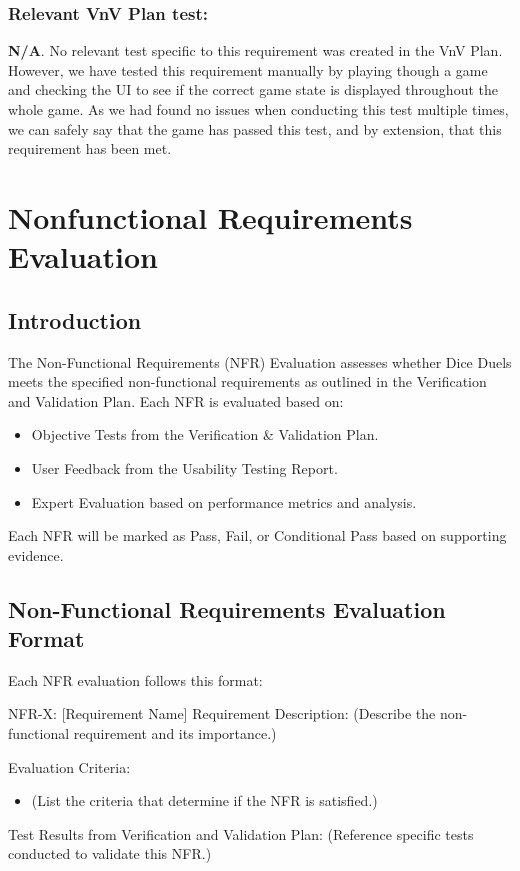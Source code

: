 \documentclass[12pt, titlepage]{article}
\begin{document}
 \subsubsection*{Relevant VnV Plan test: } \textbf{N/A}. No relevant test specific to this requirement was created in the VnV Plan. However, we have tested this requirement manually by  playing though a game and checking the UI to see if the correct game state is displayed throughout the whole game. As we had found no issues when conducting this test multiple times, we can safely say that the game has passed this test, and by extension, that this requirement has been met.


\newpage
\section{Nonfunctional Requirements Evaluation}

\subsection{Introduction}

The Non-Functional Requirements (NFR) Evaluation assesses whether Dice Duels meets the specified non-functional requirements as outlined in the Verification and Validation Plan. Each NFR is evaluated based on:
\begin{itemize}
	\item Objective Tests from the Verification \& Validation Plan.
	\item User Feedback from the Usability Testing Report.
	\item Expert Evaluation based on performance metrics and analysis.
\end{itemize}
Each NFR will be marked as Pass, Fail, or Conditional Pass based on supporting evidence.

\subsection{Non-Functional Requirements Evaluation Format}

Each NFR evaluation follows this format:

NFR-X: [Requirement Name]
Requirement Description:
(Describe the non-functional requirement and its importance.)

Evaluation Criteria:
\begin{itemize}
    \item (List the criteria that determine if the NFR is satisfied.)
\end{itemize}
Test Results from Verification and Validation Plan:
(Reference specific tests conducted to validate this NFR.)
\end{document}
